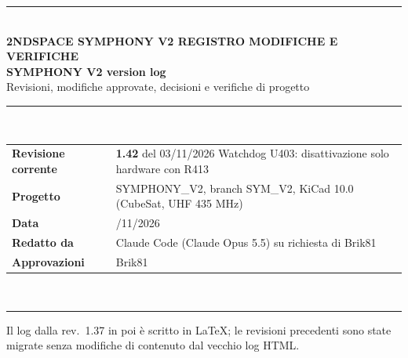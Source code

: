 \documentclass[10pt,a4paper]{article}
\begin{document}
\begin{titlepage}
\raggedright
\sffamily
{\color{accent}\rule{\linewidth}{4pt}}\\[8mm]
{\color{accent}\bfseries\small 2NDSPACE \textperiodcentered{} SYMPHONY V2 \textperiodcentered{} REGISTRO MODIFICHE E VERIFICHE}\\[4mm]
{\fontsize{26}{30}\selectfont\bfseries SYMPHONY V2 \textendash{} version log}\\[3mm]
{\large\color{tagnote} Revisioni, modifiche approvate, decisioni e verifiche di progetto}\\[10mm]
{\color{rulec}\rule{\linewidth}{0.4pt}}\\[4mm]
\begin{tabularx}{\linewidth}{@{}>{\hsize=0.3\hsize\raggedright\arraybackslash}X>{\hsize=1.7\hsize\raggedright\arraybackslash}X@{}}
\textbf{Revisione corrente} & \textbf{1.42} del 03/11/2026 \textendash{} Watchdog U403: disattivazione solo hardware con R413\\[4pt]
\textbf{Progetto} & SYMPHONY\_V2, branch SYM\_V2, KiCad 10.0 (CubeSat, UHF 435 MHz)\\[4pt]
\textbf{Data} & 03/11/2026\\[4pt]
\textbf{Redatto da} & Claude Code (Claude Opus 5.5) su richiesta di Brik81\\[4pt]
\textbf{Approvazioni} & Brik81\\
\end{tabularx}\\[3mm]
{\color{rulec}\rule{\linewidth}{0.4pt}}
\vfill
{\small Il log dalla rev.\ 1.37 in poi \`e scritto in \LaTeX; le revisioni precedenti sono state migrate senza modifiche di contenuto dal vecchio log HTML.}
\end{titlepage}

\renewcommand{\contentsname}{Indice}
\tableofcontents
\clearpage
\end{document}
